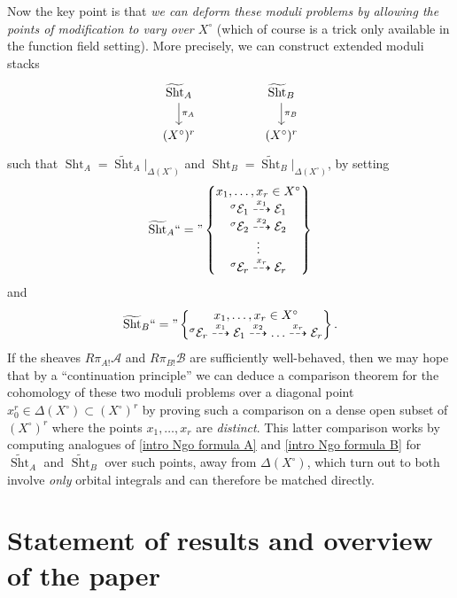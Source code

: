 \documentclass[reqno]{amsart}
\numberwithin{equation}{section}
\newcommand{\wt}[1]{\widetilde{#1}}
\newcommand{\Cal}[1]{\mathcal{#1}}
\DeclareMathOperator{\Sht}{Sht}
\theoremstyle{remark}
\numberwithin{equation}{section}
\begin{document}
Now the key point is that \emph{we can deform these moduli problems by allowing the points of modification to vary over $X^{\circ}$} (which of course is a trick only available in the function field setting). More precisely, we can construct extended moduli stacks 
\[
\begin{tikzcd}
\wt{\Sht}_A  \ar[d, "\pi_A"] & & \wt{\Sht}_B \ar[d, "\pi_B"] \\
( X^{\circ})^r & &  (X^{\circ})^r
\end{tikzcd}
\]
such that $\Sht_A = \wt{\Sht}_A|_{\Delta( X^{\circ})}$ and  $\Sht_B = \wt{\Sht}_B|_{\Delta( X^{\circ})}$, by setting
\[
\wt{\Sht}_A ``="  \left\{ \begin{array}{@{}c@{}}  x_1, \ldots, x_r \in X^{\circ} \\ 
 {}^{\sigma} \Cal{E}_1 \stackrel{x_1}\dashrightarrow  \Cal{E}_1\\
 {}^{\sigma} \Cal{E}_2 \stackrel{x_2}\dashrightarrow \Cal{E}_2 \\
  \vdots  \\
   {}^{\sigma}\Cal{E}_r  \stackrel{x_r}\dashrightarrow \Cal{E}_r	
 \end{array} \right\}   
\]
and
\[
\wt{\Sht}_B `` = " \left\{ \begin{array}{@{}c@{}}  x_1, \ldots, x_r \in X^{\circ} \\
 {}^{\sigma}\Cal{E}_r \stackrel{x_1}\dashrightarrow \Cal{E}_1 \stackrel{x_2}\dashrightarrow  \ldots \stackrel{x_r}\dashrightarrow  \Cal{E}_{r}
 \end{array} \right\}    .
\]	
If the sheaves $R\pi_{A!} \Cal{A}$ and $R\pi_{B!} \Cal{B}$ are sufficiently  well-behaved, then we may hope that by a ``continuation principle'' we can deduce a comparison theorem for the cohomology of these two moduli problems over a diagonal point $x_0^r \in \Delta(X^{\circ}) \subset (X^{\circ})^r$ by proving such a comparison on a dense open subset of $(X^{\circ})^r$ where the points $x_1, \ldots, x_r$ are \emph{distinct}. This latter comparison works by computing analogues of \eqref{intro Ngo formula A} and \eqref{intro Ngo formula B} for $\wt{\Sht}_A$ and $\wt{\Sht}_B$ over such points, away from $\Delta(X^{\circ}) $, which turn out to both involve \emph{only} orbital integrals and can therefore be matched directly. 

\section{Statement of results and overview of the paper}
	
\end{document}
